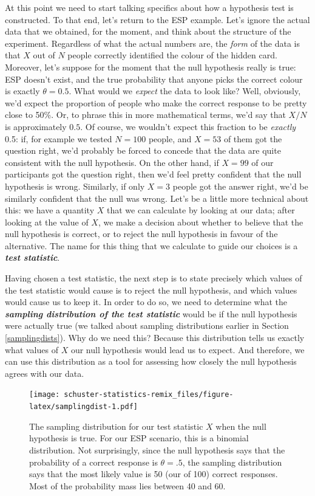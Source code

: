 \documentclass[
]{book}
\begin{document}
At this point we need to start talking specifics about how a hypothesis test is constructed. To that end, let's return to the ESP example. Let's ignore the actual data that we obtained, for the moment, and think about the structure of the experiment. Regardless of what the actual numbers are, the \emph{form} of the data is that \(X\) out of \(N\) people correctly identified the colour of the hidden card. Moreover, let's suppose for the moment that the null hypothesis really is true: ESP doesn't exist, and the true probability that anyone picks the correct colour is exactly \(\theta = 0.5\). What would we \emph{expect} the data to look like? Well, obviously, we'd expect the proportion of people who make the correct response to be pretty close to 50\%. Or, to phrase this in more mathematical terms, we'd say that \(X/N\) is approximately \(0.5\). Of course, we wouldn't expect this fraction to be \emph{exactly} 0.5: if, for example we tested \(N=100\) people, and \(X = 53\) of them got the question right, we'd probably be forced to concede that the data are quite consistent with the null hypothesis. On the other hand, if \(X = 99\) of our participants got the question right, then we'd feel pretty confident that the null hypothesis is wrong. Similarly, if only \(X=3\) people got the answer right, we'd be similarly confident that the null was wrong. Let's be a little more technical about this: we have a quantity \(X\) that we can calculate by looking at our data; after looking at the value of \(X\), we make a decision about whether to believe that the null hypothesis is correct, or to reject the null hypothesis in favour of the alternative. The name for this thing that we calculate to guide our choices is a \textbf{\emph{test statistic}}.

Having chosen a test statistic, the next step is to state precisely which values of the test statistic would cause is to reject the null hypothesis, and which values would cause us to keep it. In order to do so, we need to determine what the \textbf{\emph{sampling distribution of the test statistic}} would be if the null hypothesis were actually true (we talked about sampling distributions earlier in Section \ref{samplingdists}). Why do we need this? Because this distribution tells us exactly what values of \(X\) our null hypothesis would lead us to expect. And therefore, we can use this distribution as a tool for assessing how closely the null hypothesis agrees with our data.

\begin{figure}
\centering
\texttt{[image: schuster-statistics-remix\_files/figure-latex/samplingdist-1.pdf]}
\caption{\label{fig:samplingdist}The sampling distribution for our test statistic \(X\) when the null hypothesis is true. For our ESP scenario, this is a binomial distribution. Not surprisingly, since the null hypothesis says that the probability of a correct response is \(\theta = .5\), the sampling distribution says that the most likely value is 50 (our of 100) correct responses. Most of the probability mass lies between 40 and 60.}
\end{figure}
\end{document}
